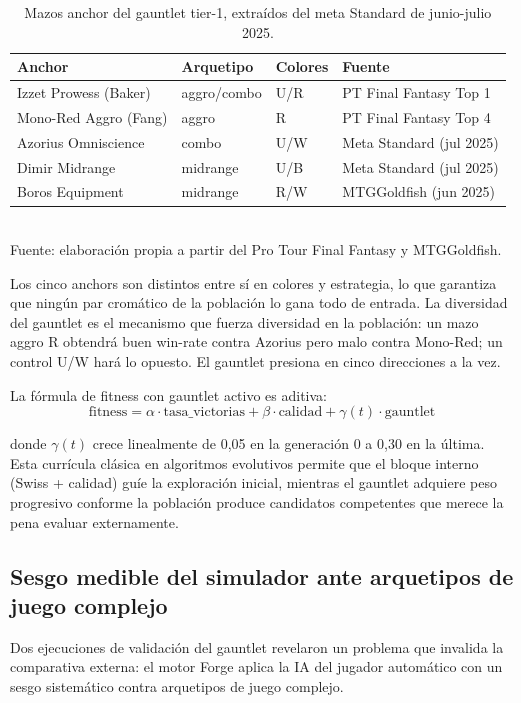 \begin{table}[H]
\centering
\caption{Mazos anchor del gauntlet tier-1, extraídos del meta Standard de junio-julio 2025.}
\label{tab:gauntlet-anchors}
\begin{tabular}{llll}
\toprule
\textbf{Anchor} & \textbf{Arquetipo} & \textbf{Colores} & \textbf{Fuente} \\
\midrule
Izzet Prowess (Baker)   & aggro/combo & U/R & PT Final Fantasy Top 1 \\
Mono-Red Aggro (Fang)   & aggro       & R   & PT Final Fantasy Top 4 \\
Azorius Omniscience     & combo       & U/W & Meta Standard (jul 2025) \\
Dimir Midrange          & midrange    & U/B & Meta Standard (jul 2025) \\
Boros Equipment         & midrange    & R/W & MTGGoldfish (jun 2025) \\
\bottomrule
\end{tabular}
\\[2pt]{\footnotesize Fuente: elaboración propia a partir del Pro Tour Final Fantasy y MTGGoldfish.}
\end{table}

Los cinco anchors son distintos entre sí en colores y estrategia, lo que garantiza que ningún par cromático de la población lo gana todo de entrada. La diversidad del gauntlet es el mecanismo que fuerza diversidad en la población: un mazo aggro R obtendrá buen win-rate contra Azorius pero malo contra Mono-Red; un control U/W hará lo opuesto. El gauntlet presiona en cinco direcciones a la vez.

La fórmula de fitness con gauntlet activo es aditiva:
$$\text{fitness} = \alpha \cdot \text{tasa\_victorias} + \beta \cdot \text{calidad} + \gamma(t) \cdot \text{gauntlet}$$

donde $\gamma(t)$ crece linealmente de 0,05 en la generación 0 a 0,30 en la última. Esta currícula clásica en algoritmos evolutivos permite que el bloque interno (Swiss + calidad) guíe la exploración inicial, mientras el gauntlet adquiere peso progresivo conforme la población produce candidatos competentes que merece la pena evaluar externamente.

\subsection{Sesgo medible del simulador ante arquetipos de juego complejo}

Dos ejecuciones de validación del gauntlet revelaron un problema que invalida la comparativa externa: el motor Forge aplica la IA del jugador automático con un sesgo sistemático contra arquetipos de juego complejo.

